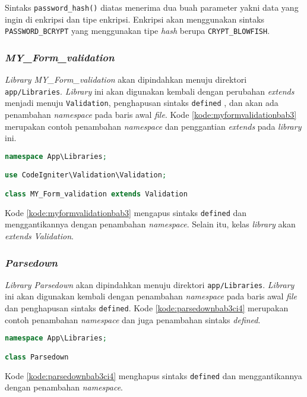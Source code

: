 Sintaks \texttt{password\_hash()} diatas menerima dua buah parameter yakni data yang ingin di enkripsi dan tipe enkripsi. Enkripsi akan menggunakan sintaks \texttt{PASSWORD\_BCRYPT} yang menggunakan tipe \textit{hash} berupa \texttt{CRYPT\_BLOWFISH}.

\subsubsection{\textit{MY\_Form\_validation}}
\textit{Library MY\_Form\_validation} akan dipindahkan menuju direktori \texttt{app/Libraries}. \textit{Library} ini akan digunakan kembali dengan perubahan \textit{extends} menjadi menuju \texttt{Validation}, penghapusan sintaks \texttt{defined} , dan akan ada penambahan \textit{namespace} pada baris awal \textit{file}. Kode \ref{kode:myformvalidationbab3} merupakan contoh penambahan \textit{namespace} dan penggantian \textit{extends} pada \textit{library} ini.
\begin{lstlisting}[language=PHP, caption=Contoh perubahan \textit{library MY\_Form\_validation} pada \textit{CodeIgniter 4}, label=kode:myformvalidationbab3]
namespace App\Libraries;

use CodeIgniter\Validation\Validation;

class MY_Form_validation extends Validation
\end{lstlisting}
Kode \ref{kode:myformvalidationbab3} mengapus sintaks \texttt{defined} dan menggantikannya dengan penambahan \textit{namespace}. Selain itu, kelas \textit{library} akan \textit{extends} \textit{Validation}.

\subsubsection{\textit{Parsedown}}
\textit{Library Parsedown} akan dipindahkan menuju direktori \texttt{app/Libraries}. \textit{Library} ini akan digunakan kembali dengan penambahan \textit{namespace} pada baris awal \textit{file} dan penghapusan sintaks \texttt{defined}.  Kode \ref{kode:parsedownbab3ci4} merupakan contoh penambahan \textit{namespace} dan juga penambahan sintaks \textit{defined}.
\begin{lstlisting}[language=PHP, caption=Contoh perubahan \textit{library Parsedown} pada \textit{CodeIgniter 4}, label=kode:parsedownbab3ci4]
namespace App\Libraries;

class Parsedown
\end{lstlisting}
Kode \ref{kode:parsedownbab3ci4} menghapus sintaks \texttt{defined} dan menggantikannya dengan penambahan \textit{namespace}.
